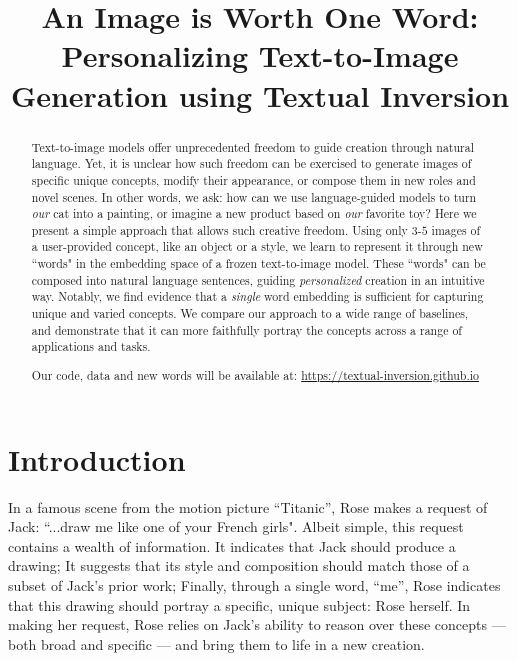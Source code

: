 \title{An Image is Worth One Word: Personalizing Text-to-Image Generation using Textual Inversion}

\begin{abstract}
Text-to-image models offer unprecedented freedom to guide creation through natural language. Yet, it is unclear how such freedom can be exercised to generate images of specific unique concepts, modify their appearance, or compose them in new roles and novel scenes. In other words, we ask: how can we use language-guided models to turn \textit{our} cat into a painting, or imagine a new product based on \textit{our} favorite toy? Here we present a simple approach that allows such creative freedom. Using only $3$-$5$ images of a user-provided concept, like an object or a style, we learn to represent it through new ``words" in the embedding space of a frozen text-to-image model. These ``words" can be composed into natural language sentences, guiding \textit{personalized} creation in an intuitive way. Notably, we find evidence that a \textit{single} word embedding is sufficient for capturing unique and varied concepts. We compare our approach to a wide range of baselines, and demonstrate that it can more faithfully portray the concepts across a range of applications and tasks. 

Our code, data and new words will be available at: \url{https://textual-inversion.github.io}
\end{abstract}

\section{Introduction}

In a famous scene from the motion picture ``Titanic'', Rose makes a request of Jack: ``...draw me like one of your French girls". Albeit simple, this request contains a wealth of information. It indicates that Jack should produce a drawing; It suggests that its style and composition should match those of a subset of Jack's prior work; Finally, through a single word, ``me'', Rose indicates that this drawing should portray a specific, unique subject: Rose herself. In making her request, Rose relies on Jack's ability to reason over these concepts --- both broad and specific --- and bring them to life in a new creation.

